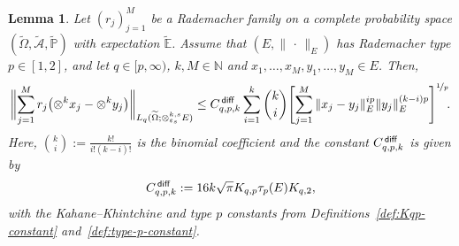 \documentclass[reqno]{amsart}
\numberwithin{equation}{section}
\newcommand{\bbE}{\mathbb{E}}
\newcommand{\bbN}{\mathbb{N}}
\newcommand{\bbP}{\mathbb{P}}
\newcommand{\cA}{\mathcal{A}}
\newcommand{\Omegat}{\widetilde{\Omega}}
\newcommand{\cAt}{\widetilde{\cA}}
\newcommand{\bbPt}{\widetilde{\bbP}}
\newcommand{\bbEt}{\widetilde{\bbE}}
\newcommand{\xk}{\otimes^k}
\newcommand{\xkseps}{\otimes^{k,s}_{\varepsilon_s}}
\newcommand{\norm}[2]{     \| #1       \|_{ #2 }}
\newcommand{\Cdiff}{C^{\,\sf diff}_{q,p,k}}
\newtheorem{lemma}{Lemma}[section]
\theoremstyle{remark}
\theoremstyle{definition}
\begin{document}
\begin{lemma}\label{lem:MLMC-k}
	Let $(r_j)_{j=1}^M$ be   
	a Rademacher family 
	on a complete probability space 
	$(\Omegat,\cAt,\bbPt)$ 
	with expectation $\bbEt$.  
	Assume that  
	$(E,\norm{\,\cdot\,}{E})$ 
	has Rademacher type ${p\in[1,2]}$, and 
	let ${q\in[p,\infty)}$, $k,M\in\bbN$ and 
	$x_1,\ldots,x_M, y_1,\ldots, y_M \in E$. 
	Then,  
	\begin{equation}\label{eq:lem:MLMC-k} 
	\biggl\| 
	\sum_{j=1}^M 
	r_j \bigl( \xk x_j - \xk y_j \bigr) 
	\biggr\|_{L_q(\Omegat;\xkseps E)}  
	\leq 
	\Cdiff 
	\sum_{i=1}^{k}
	\binom{k}{i} 
	\Biggl[  
	\sum_{j=1}^M 
	\norm{ x_j - y_j }{E}^{ip} \norm{ y_j }{E}^{(k-i)p}  
	\Biggr]^{\nicefrac{1}{p}} \!. 
	\end{equation}
	Here,  
	$\binom{k}{i} := \frac{k!}{i!(k-i)!}$ 
	is the binomial coefficient and 
	the constant $\Cdiff$ is given by 
	\begin{equation}\label{eq:Cdiff}
	\Cdiff := 16 k \sqrt{\pi} K_{q,p} \tau_{p}(E) K_{q,2}, 
	\end{equation}
	with the Kahane--Khintchine and type $p$ constants 
	from Definitions~\ref{def:Kqp-constant} 
	and~\ref{def:type-p-constant}. 
\end{lemma} 
\end{document}
